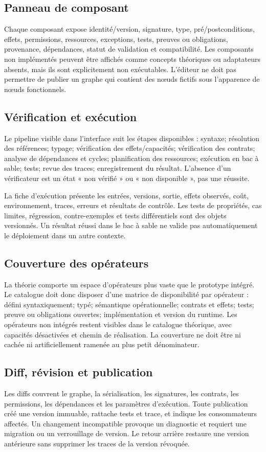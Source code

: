 \documentclass[11pt,a4paper]{article}
\begin{document}
\subsection{Panneau de composant}
Chaque composant expose identité/version, signature, type, pré/postconditions, effets, permissions, ressources, exceptions, tests, preuves ou obligations, provenance, dépendances, statut de validation et compatibilité. Les composants non implémentés peuvent être affichés comme concepts théoriques ou adaptateurs absents, mais ils sont explicitement non exécutables. L'éditeur ne doit pas permettre de publier un graphe qui contient des nœuds fictifs sous l'apparence de nœuds fonctionnels.

\subsection{Vérification et exécution}
Le pipeline visible dans l'interface suit les étapes disponibles : syntaxe; résolution des références; typage; vérification des effets/capacités; vérification des contrats; analyse de dépendances et cycles; planification des ressources; exécution en bac à sable; tests; revue des traces; enregistrement du résultat. L'absence d'un vérificateur est un état « non vérifié » ou « non disponible », pas une réussite.

La fiche d'exécution présente les entrées, versions, sortie, effets observés, coût, environnement, traces, erreurs et résultats de contrôle. Les tests de propriétés, cas limites, régression, contre-exemples et tests différentiels sont des objets versionnés. Un résultat réussi dans le bac à sable ne valide pas automatiquement le déploiement dans un autre contexte.

\subsection{Couverture des opérateurs}
La théorie comporte un espace d'opérateurs plus vaste que le prototype intégré. Le catalogue doit donc disposer d'une matrice de disponibilité par opérateur : défini syntaxiquement; typé; sémantique opérationnelle; contrats et effets; tests; preuve ou obligations ouvertes; implémentation et version du runtime. Les opérateurs non intégrés restent visibles dans le catalogue théorique, avec capacités désactivées et chemin de réalisation. La couverture ne doit être ni cachée ni artificiellement ramenée au plus petit dénominateur.

\subsection{Diff, révision et publication}
Les diffs couvrent le graphe, la sérialisation, les signatures, les contrats, les permissions, les dépendances et les paramètres d'exécution. Toute publication créé une version immuable, rattache tests et trace, et indique les consommateurs affectés. Un changement incompatible provoque un diagnostic et requiert une migration ou un verrouillage de version. Le retour arrière restaure une version antérieure sans supprimer les traces de la version révoquée.
\end{document}
